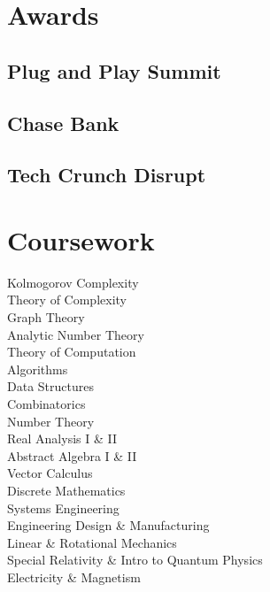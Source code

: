 \documentclass[]{jhearn-resume}
\begin{document}
\begin{minipage}[t]{0.34\textwidth} 

\vspace{25pt}

\vspace{-\topsep}

\section{Awards}
\subsection{Plug and Play Summit}
\sectionsep

\subsection{Chase Bank}
\sectionsep

\subsection{Tech Crunch Disrupt}
\sectionsep


\section{Coursework}
\small Kolmogorov Complexity\\
Theory of Complexity\\
Graph Theory\\
Analytic Number Theory\\
Theory of Computation \\
Algorithms \\
Data Structures \\
Combinatorics \\
Number Theory \\
Real Analysis I \& II \\
Abstract Algebra I \& II\\
Vector Calculus\\
Discrete Mathematics\\
Systems Engineering\\
Engineering Design \& Manufacturing\\
Linear \& Rotational Mechanics\\
Special Relativity \& Intro to Quantum Physics\\
Electricity \& Magnetism\\
\sectionsep
\vspace{-\topsep}

\end{minipage}
\end{document}
